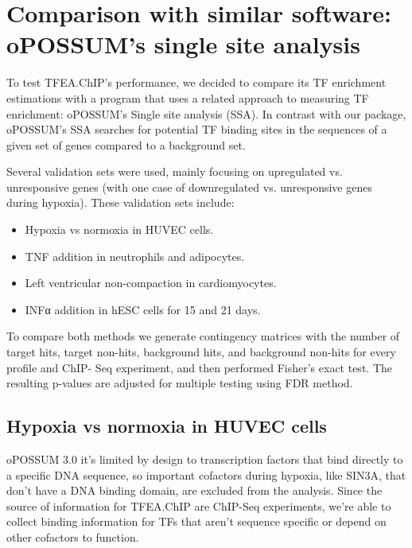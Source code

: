 \documentclass[a4paper, 12pt ]{article}
\begin{document}
\section{Comparison with similar software: oPOSSUM's single site analysis}

To test TFEA.ChIP's performance, we decided to compare its TF enrichment estimations with a program that uses a related approach to measuring TF enrichment: oPOSSUM's Single site analysis (SSA)\cite{opossum}. In contrast with our package, oPOSSUM's SSA searches for potential TF binding sites in the sequences of a given set of genes compared to a background set.

Several validation sets were used, mainly focusing on upregulated vs. unresponsive genes
(with one case of downregulated vs. unresponsive genes during hypoxia). These validation
sets include:
\begin{itemize} \itemsep-0.5em
	\item Hypoxia vs normoxia in HUVEC cells.
	\item TNF addition in neutrophils and adipocytes.
	\item Left ventricular non-compaction in cardiomyocytes.
	\item INFα addition in hESC cells for 15 and 21 days.
\end{itemize}

To compare both methods we generate contingency matrices with the number of target
hits, target non-hits, background hits, and background non-hits for every profile and ChIP- Seq experiment, and then performed Fisher’s exact test. The resulting p-values are
adjusted for multiple testing using FDR method.

\subsection*{Hypoxia vs normoxia in HUVEC cells}

oPOSSUM 3.0 it’s limited by design to transcription factors that bind directly to a specific DNA sequence, so important cofactors during hypoxia, like SIN3A, that don’t have a DNA binding domain, are excluded from the analysis. Since the source of information for TFEA.ChIP are ChIP-Seq experiments, we’re able to collect binding information for TFs that aren’t sequence specific or depend on other cofactors to function.
\end{document}
